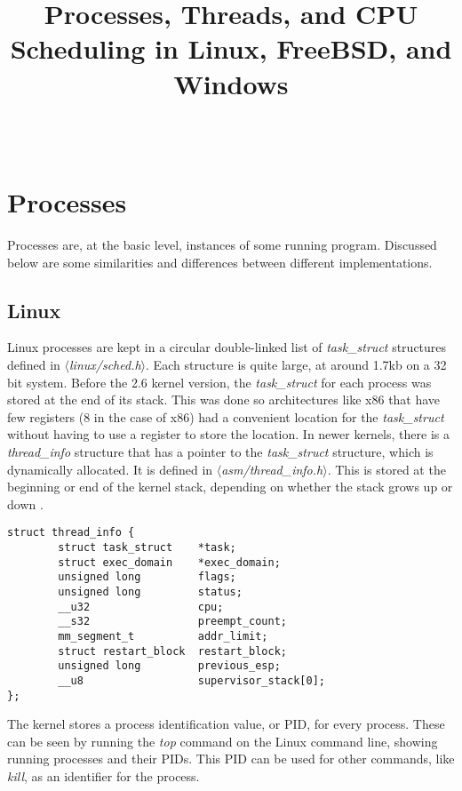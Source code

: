 \documentclass[10pt,draftclsnofoot,onecolumn,journal,compsoc]{IEEEtran}
\title{Processes, Threads, and CPU Scheduling in Linux, FreeBSD, and Windows}
\author{
  \IEEEauthorblockN{Heidi Clayton} \\
  \IEEEauthorblockA{CS 444: Operating Systems II Winter 2017 \\ Oregon State University}
}
\begin{document}
\maketitle
\newpage
\tableofcontents
\newpage

\section{Processes}
Processes are, at the basic level, instances of some running program. Discussed below are some similarities and differences between different implementations.

\subsection{Linux}
Linux processes are kept in a circular double-linked list of \textit{task\_struct} structures defined in \textit{$\langle$linux/sched.h$\rangle$}. Each structure is quite large, at around 1.7kb on a 32 bit system. Before the 2.6 kernel version, the \textit{task\_struct} for each process was stored at the end of its stack. This was done so architectures like x86 that have few registers (8 in the case of x86) had a convenient location for the \textit{task\_struct} without having to use a register to store the location. In newer kernels, there is a \textit{thread\_info} structure that has a pointer to the \textit{task\_struct} structure, which is dynamically allocated. It is defined in \textit{$\langle$asm/thread\_info.h$\rangle$}. This is stored at the beginning or end of the kernel stack, depending on whether the stack grows up or down \cite{linux_proc}.

\begin{lstlisting}[caption={\textit{thread\_info} structure \cite{linux_proc}}]
struct thread_info {
        struct task_struct    *task;
        struct exec_domain    *exec_domain;
        unsigned long         flags;
        unsigned long         status;
        __u32                 cpu;
        __s32                 preempt_count;
        mm_segment_t          addr_limit;
        struct restart_block  restart_block;
        unsigned long         previous_esp;
        __u8                  supervisor_stack[0];
};
\end{lstlisting}

The kernel stores a process identification value, or PID, for every process. These can be seen by running the \textit{top} command on the Linux command line, showing running processes and their PIDs. This PID can be used for other commands, like \textit{kill}, as an identifier for the process.
\end{document}
